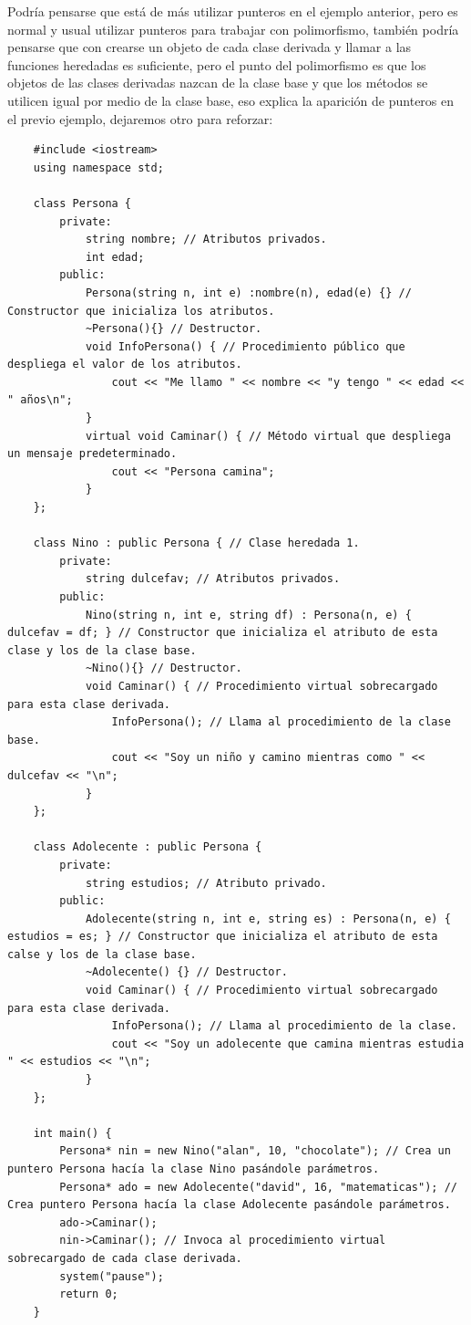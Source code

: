 Podría pensarse que está de más utilizar punteros en el ejemplo anterior, pero es normal y usual utilizar punteros para trabajar con polimorfismo, también podría pensarse que con crearse un objeto de cada clase derivada y llamar a las funciones heredadas es suficiente, pero el punto del polimorfismo es que los objetos de las clases derivadas nazcan de la clase base y que los métodos se utilicen igual por medio de la clase base, eso explica la aparición de punteros en el previo ejemplo, dejaremos otro para reforzar:
\begin{lstlisting}
    #include <iostream>
    using namespace std;
    
    class Persona {
        private:
            string nombre; // Atributos privados.
            int edad;
        public:
            Persona(string n, int e) :nombre(n), edad(e) {} // Constructor que inicializa los atributos.
            ~Persona(){} // Destructor.
            void InfoPersona() { // Procedimiento público que despliega el valor de los atributos.
                cout << "Me llamo " << nombre << "y tengo " << edad << " años\n";
            }
            virtual void Caminar() { // Método virtual que despliega un mensaje predeterminado.
                cout << "Persona camina";
            }
    };

    class Nino : public Persona { // Clase heredada 1.
        private:
            string dulcefav; // Atributos privados.
        public:
            Nino(string n, int e, string df) : Persona(n, e) { dulcefav = df; } // Constructor que inicializa el atributo de esta clase y los de la clase base.
            ~Nino(){} // Destructor.
            void Caminar() { // Procedimiento virtual sobrecargado para esta clase derivada.
                InfoPersona(); // Llama al procedimiento de la clase base.
                cout << "Soy un niño y camino mientras como " << dulcefav << "\n";
            }
    };

    class Adolecente : public Persona {
        private:
            string estudios; // Atributo privado.
        public:
            Adolecente(string n, int e, string es) : Persona(n, e) { estudios = es; } // Constructor que inicializa el atributo de esta calse y los de la clase base.
            ~Adolecente() {} // Destructor.
            void Caminar() { // Procedimiento virtual sobrecargado para esta clase derivada.
                InfoPersona(); // Llama al procedimiento de la clase.
                cout << "Soy un adolecente que camina mientras estudia " << estudios << "\n";
            }
    };

    int main() {
        Persona* nin = new Nino("alan", 10, "chocolate"); // Crea un puntero Persona hacía la clase Nino pasándole parámetros.
        Persona* ado = new Adolecente("david", 16, "matematicas"); // Crea puntero Persona hacía la clase Adolecente pasándole parámetros.
        ado->Caminar();
        nin->Caminar(); // Invoca al procedimiento virtual sobrecargado de cada clase derivada.
        system("pause");
        return 0;
    }
\end{lstlisting}


